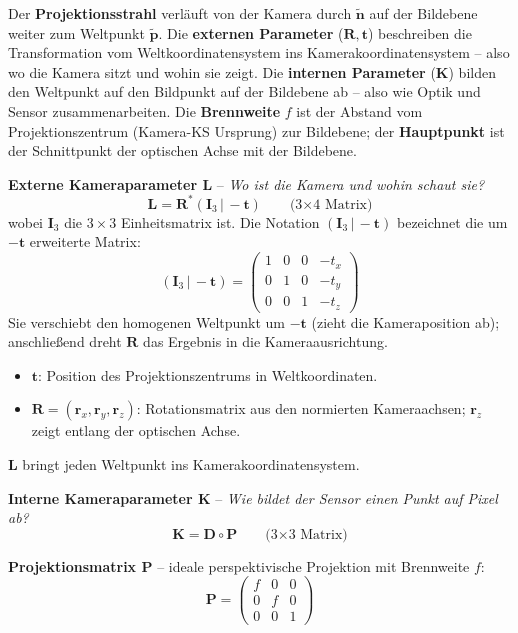 \documentclass[12pt, a4paper]{article}
\begin{document}
Der \textbf{Projektionsstrahl} verläuft von der Kamera durch $\tilde{\mathbf{n}}$ auf der Bildebene weiter zum Weltpunkt $\tilde{\mathbf{p}}$. Die \textbf{externen Parameter} ($\mathbf{R}, \mathbf{t}$) beschreiben die Transformation vom Weltkoordinatensystem ins Kamerakoordinatensystem -- also wo die Kamera sitzt und wohin sie zeigt. Die \textbf{internen Parameter} ($\mathbf{K}$) bilden den Weltpunkt auf den Bildpunkt auf der Bildebene ab -- also wie Optik und Sensor zusammenarbeiten. Die \textbf{Brennweite} $f$ ist der Abstand vom Projektionszentrum (Kamera-KS Ursprung) zur Bildebene; der \textbf{Hauptpunkt} ist der Schnittpunkt der optischen Achse mit der Bildebene.

\medskip
\textbf{Externe Kameraparameter L} -- \textit{Wo ist die Kamera und wohin schaut sie?}
\[
  \mathbf{L} = \mathbf{R}^*(\mathbf{I}_3\,|\,-\mathbf{t})
  \qquad \text{(3×4 Matrix)}
\]
wobei $\mathbf{I}_3$ die $3\times3$ Einheitsmatrix ist. Die Notation $(\mathbf{I}_3\,|\,-\mathbf{t})$ bezeichnet die um $-\mathbf{t}$ erweiterte Matrix:
\[
  (\mathbf{I}_3\,|\,-\mathbf{t}) =
  \begin{pmatrix}1&0&0&-t_x\\0&1&0&-t_y\\0&0&1&-t_z\end{pmatrix}
\]
Sie verschiebt den homogenen Weltpunkt um $-\mathbf{t}$ (zieht die Kameraposition ab); anschließend dreht $\mathbf{R}$ das Ergebnis in die Kameraausrichtung.
\begin{itemize}
  \item $\mathbf{t}$: Position des Projektionszentrums in Weltkoordinaten.
  \item $\mathbf{R} = (\mathbf{r}_x, \mathbf{r}_y, \mathbf{r}_z)$: Rotationsmatrix aus den normierten Kameraachsen; $\mathbf{r}_z$ zeigt entlang der optischen Achse.
\end{itemize}
$\mathbf{L}$ bringt jeden Weltpunkt ins Kamerakoordinatensystem.

\medskip
\textbf{Interne Kameraparameter K} -- \textit{Wie bildet der Sensor einen Punkt auf Pixel ab?}
\[
  \mathbf{K} = \mathbf{D} \circ \mathbf{P}
  \qquad \text{(3×3 Matrix)}
\]

\textbf{Projektionsmatrix P} -- ideale perspektivische Projektion mit Brennweite $f$:
\[
  \mathbf{P} = \begin{pmatrix}f&0&0\\0&f&0\\0&0&1\end{pmatrix}
\]
\end{document}
